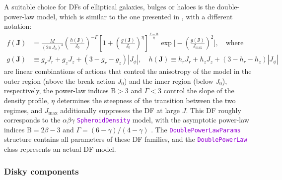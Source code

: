 \documentclass[12pt]{article}
\newcommand{\ttt}[1]{\textcolor{darkviolet}{\texttt{#1}}}
\newcommand{\bJ}{\boldsymbol{J}}
\newcommand{\Beta}{\mathrm B}
\begin{document}
A suitable choice for DFs of elliptical galaxies, bulges or haloes is the double-power-law model, which is similar to the one presented in \cite{Posti2015}, with a different notation:
\begin{align*}
f(\bJ) &= \frac{M}{(2\pi\, J_0)^3} \left(\frac{h(\bJ)}{J_0}\right)^{-\Gamma}
\left[1 + \left(\frac{g(\bJ)}{J_0}\right)^\eta \right]^{\frac{\Gamma-\Beta}{\eta}}
\exp\bigg[-\left(\frac{g(\bJ)}{J_\mathrm{max}}\right)^2\bigg],  \quad\mbox{where} \\
g(\bJ) &\equiv g_r J_r + g_z J_z + (3-g_r-g_z) |J_\phi|, \quad
h(\bJ)  \equiv h_r J_r + h_z J_z + (3-h_r-h_z) |J_\phi|
\end{align*}
are linear combinations of actions that control the anisotropy of the model in the outer region (above the break action $J_0$) and the inner region (below $J_0$), respectively, the power-law indices $\Beta>3$ and $\Gamma<3$ control the slope of the density profile, $\eta$ determines the steepness of the transition between the two regimes, and $J_\mathrm{max}$ additionally suppresses the DF at large $J$. This DF roughly corresponds to the $\alpha\beta\gamma$ \ttt{SpheroidDensity} model, with the asymptotic power-law indices $\Beta=2\beta-3$ and $\Gamma=(6-\gamma)/(4-\gamma)$ . The \ttt{DoublePowerLawParams} structure contains all parameters of these DF families, and the \ttt{DoublePowerLaw} class represents an actual DF model.

\subsubsection{Disky components}  \label{sec:DFdisk}
\end{document}
